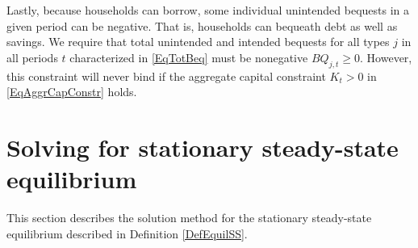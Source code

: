 \documentclass[letterpaper,12pt]{article}
\theoremstyle{definition}
\renewcommand\theenumi{\roman{enumi}}
\begin{document}
  Lastly, because households can borrow, some individual unintended bequests in a given period can be negative. That is, households can bequeath debt as well as savings. We require that total unintended and intended bequests for all types $j$ in all periods $t$ characterized in \eqref{EqTotBeq} must be nonegative $BQ_{j,t}\geq 0$. However, this constraint will never bind if the aggregate capital constraint $K_t>0$ in \eqref{EqAggrCapConstr} holds.


\newpage
\section{Solving for stationary steady-state equilibrium}\label{AppSSsolve}

  \setcounter{equation}{0}
  \renewcommand\theenumi{\arabic{enumi}}
  \renewcommand\theenumii{\alph{enumii}}
  \renewcommand\theenumiii{\roman{enumiii}}

  This section describes the solution method for the stationary steady-state equilibrium described in Definition \ref{DefEquilSS}.
\end{document}
